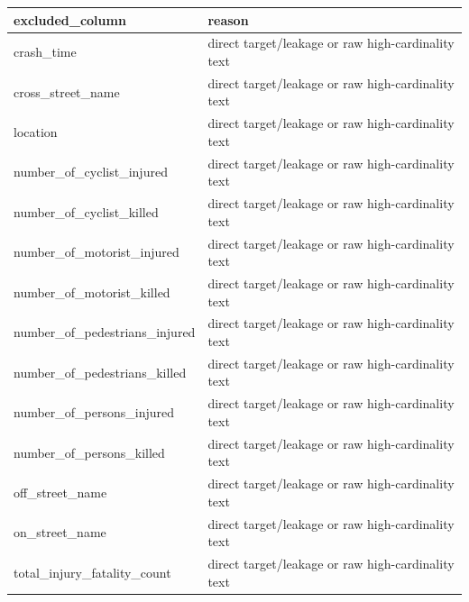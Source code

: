 \begin{tabular}{ll}
\toprule
excluded_column & reason \\
\midrule
crash_time & direct target/leakage or raw high-cardinality text \\
cross_street_name & direct target/leakage or raw high-cardinality text \\
location & direct target/leakage or raw high-cardinality text \\
number_of_cyclist_injured & direct target/leakage or raw high-cardinality text \\
number_of_cyclist_killed & direct target/leakage or raw high-cardinality text \\
number_of_motorist_injured & direct target/leakage or raw high-cardinality text \\
number_of_motorist_killed & direct target/leakage or raw high-cardinality text \\
number_of_pedestrians_injured & direct target/leakage or raw high-cardinality text \\
number_of_pedestrians_killed & direct target/leakage or raw high-cardinality text \\
number_of_persons_injured & direct target/leakage or raw high-cardinality text \\
number_of_persons_killed & direct target/leakage or raw high-cardinality text \\
off_street_name & direct target/leakage or raw high-cardinality text \\
on_street_name & direct target/leakage or raw high-cardinality text \\
total_injury_fatality_count & direct target/leakage or raw high-cardinality text \\
\bottomrule
\end{tabular}
